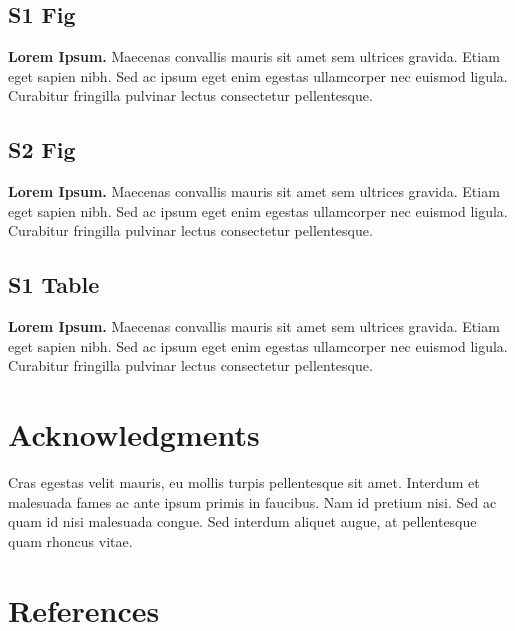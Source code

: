 \documentclass[10pt,letterpaper]{article}
\begin{document}
\subsection*{S1 Fig}
\label{S1_Fig}
{\bf Lorem Ipsum.} Maecenas convallis mauris sit amet sem ultrices gravida. Etiam eget sapien nibh. Sed ac ipsum eget enim egestas ullamcorper nec euismod ligula. Curabitur fringilla pulvinar lectus consectetur pellentesque.

\subsection*{S2 Fig}
\label{S2_Fig}
{\bf Lorem Ipsum.} Maecenas convallis mauris sit amet sem ultrices gravida. Etiam eget sapien nibh. Sed ac ipsum eget enim egestas ullamcorper nec euismod ligula. Curabitur fringilla pulvinar lectus consectetur pellentesque.

\subsection*{S1 Table}
\label{S1_Table}
{\bf Lorem Ipsum.} Maecenas convallis mauris sit amet sem ultrices gravida. Etiam eget sapien nibh. Sed ac ipsum eget enim egestas ullamcorper nec euismod ligula. Curabitur fringilla pulvinar lectus consectetur pellentesque.

\section*{Acknowledgments}
Cras egestas velit mauris, eu mollis turpis pellentesque sit amet. Interdum et malesuada fames ac ante ipsum primis in faucibus. Nam id pretium nisi. Sed ac quam id nisi malesuada congue. Sed interdum aliquet augue, at pellentesque quam rhoncus vitae.

\nolinenumbers

\section*{References}
% 
%
%
\end{document}
